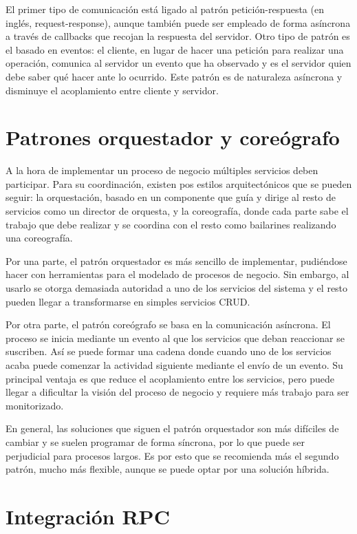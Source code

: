 \documentclass[11pt,a4paper]{article}
\begin{document}
El primer tipo de comunicación está ligado al patrón petición-respuesta (en inglés, request-response), aunque también puede ser empleado de forma asíncrona a través de callbacks que recojan la respuesta del servidor. Otro tipo de patrón es el basado en eventos: el cliente, en lugar de hacer una petición para realizar una operación, comunica al servidor un evento que ha observado y es el servidor quien debe saber qué hacer ante lo ocurrido. Este patrón es de naturaleza asíncrona y disminuye el acoplamiento entre cliente y servidor.

\section{Patrones orquestador y coreógrafo}
A la hora de implementar un proceso de negocio múltiples servicios deben participar. Para su coordinación, existen pos estilos arquitectónicos que se pueden seguir: la orquestación, basado en un componente que guía y dirige al resto de servicios como un director de orquesta, y la coreografía, donde cada parte sabe el trabajo que debe realizar y se coordina con el resto como bailarines realizando una coreografía.

Por una parte, el patrón orquestador es más sencillo de implementar, pudiéndose hacer con herramientas para el modelado de procesos de negocio. Sin embargo, al usarlo se otorga demasiada autoridad a uno de los servicios del sistema y el resto pueden llegar a transformarse en simples servicios CRUD.

Por otra parte, el patrón coreógrafo se basa en la comunicación asíncrona. El proceso se inicia mediante un evento al que los servicios que deban reaccionar se suscriben. Así se puede formar una cadena donde cuando uno de los servicios acaba puede comenzar la actividad siguiente mediante el envío de un evento. Su principal ventaja es que reduce el acoplamiento entre los servicios, pero puede llegar a dificultar la visión del proceso de negocio y requiere más trabajo para ser monitorizado.

En general, las soluciones que siguen el patrón orquestador son más difíciles de cambiar y se suelen programar de forma síncrona, por lo que puede ser perjudicial para procesos largos. Es por esto que se recomienda más el segundo patrón, mucho más flexible, aunque se puede optar por una solución híbrida.

\section{Integración RPC}
\end{document}
